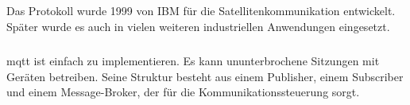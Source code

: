 \subparagraph{}
Das Protokoll wurde 1999 von IBM für die
Satellitenkommunikation entwickelt. Später wurde es auch in vielen weiteren
industriellen Anwendungen eingesetzt.

\subparagraph{}
\ac{mqtt} ist einfach zu implementieren. Es kann ununterbrochene Sitzungen mit
Geräten betreiben. Seine Struktur besteht aus einem Publisher, einem Subscriber
und einem Message-Broker, der für die Kommunikationssteuerung sorgt.
\cite{dennisseidel2018}
